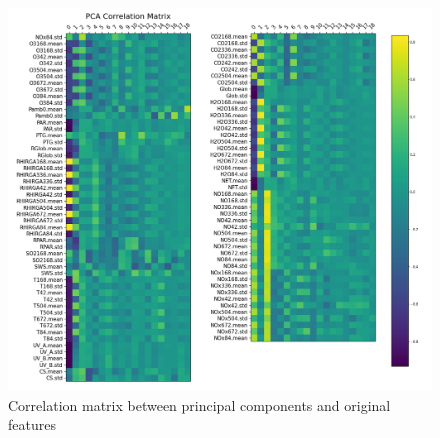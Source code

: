 \begin{figure}[!ht]
   \centering
   \includegraphics[width=\textwidth]{images/pca_correlation_matrix.png}
   \caption{Correlation matrix between principal components and original features}
   \label{fig:pca_correlation_matrix}
\end{figure}
